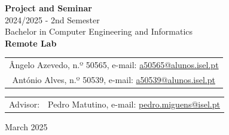 \documentclass[a4paper,twoside,11pt]{article}
\begin{document}
\begin{titlepage}
\begin{center}


\vspace{1cm}

{\Large \textbf{Project and Seminar}\\}
\vspace{0.3cm}
{\Large 2024/2025 - 2nd Semester\\}
\vspace{0.8cm}
{\Large Bachelor in Computer Engineering and Informatics\\}
\vspace{1cm}
{\Huge \textbf{Remote Lab}\\}
\vspace{2cm}

\begin{tabular}{c}
    Ângelo Azevedo, n.º 50565, e-mail: \href{mailto:a50565@alunos.isel.pt}{a50565@alunos.isel.pt}\\
    António Alves, n.º 50539, e-mail: \href{mailto:a50539@alunos.isel.pt}{a50539@alunos.isel.pt}\\
\end{tabular}

\vspace{2cm}

\begin{tabular}{ll}
    {Advisor:} & Pedro Matutino, e-mail: \href{mailto:pedro.miguens@isel.pt}{pedro.miguens@isel.pt} \\
\end{tabular}

\vspace{1cm}

March 2025

\end{center}
\end{titlepage}
\end{document}
